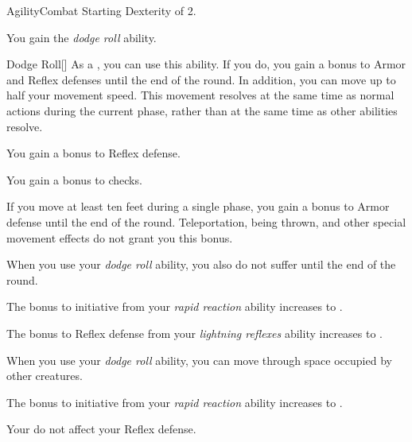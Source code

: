     \begin{feat}{Agility}{Combat}
        \featpre Starting Dexterity of 2.

         You gain the \textit{dodge roll} ability.
        \begin{ability}{Dodge Roll}[]
            As a , you can use this ability.
            If you do, you gain a  bonus to Armor and Reflex defenses until the end of the round.
            In addition, you can move up to half your movement speed.
            This movement resolves at the same time as normal actions during the current phase, rather than at the same time as other  abilities resolve.
        \end{ability}

         You gain a  bonus to Reflex defense.

         You gain a  bonus to  checks.

         If you move at least ten feet during a single phase, you gain a  bonus to Armor defense until the end of the round.
        Teleportation, being thrown, and other special movement effects do not grant you this bonus.

         When you use your \textit{dodge roll} ability, you also do not suffer  until the end of the round.

         The bonus to initiative from your \textit{rapid reaction} ability increases to .

         The bonus to Reflex defense from your \textit{lightning reflexes} ability increases to .

         When you use your \textit{dodge roll} ability, you can move through space occupied by other creatures.

         The bonus to initiative from your \textit{rapid reaction} ability increases to .

         Your  do not affect your Reflex defense.
    \end{feat}

